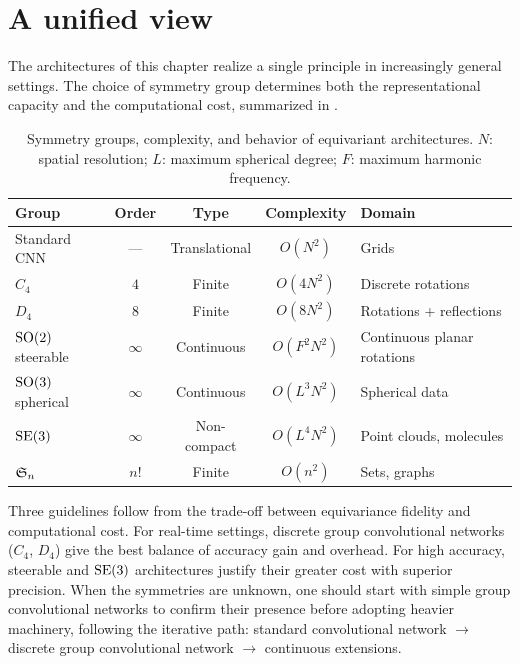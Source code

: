 \section{A unified view}
\label{sec:groups:unified}

The architectures of this chapter realize a single principle in increasingly
general settings. The choice of symmetry group determines both the
representational capacity and the computational cost, summarized in
.

\begin{table}[h]
\centering
\small
\caption{Symmetry groups, complexity, and behavior of equivariant
architectures. $N$: spatial resolution; $L$: maximum spherical degree; $F$:
maximum harmonic frequency.}
\label{tab:groups:comparison}
\begin{tabular}{@{}lcccl@{}}
\toprule
\textbf{Group} & \textbf{Order} & \textbf{Type} & \textbf{Complexity} & \textbf{Domain} \\
\midrule
Standard CNN & --- & Translational & $O(N^2)$ & Grids \\
$C_4$ & $4$ & Finite & $O(4 N^2)$ & Discrete rotations \\
$D_4$ & $8$ & Finite & $O(8 N^2)$ & Rotations + reflections \\
$\operatorname{SO}(2)$ steerable & $\infty$ & Continuous & $O(F^2 N^2)$ & Continuous planar rotations \\
$\operatorname{SO}(3)$ spherical & $\infty$ & Continuous & $O(L^3 N^2)$ & Spherical data \\
$\operatorname{SE}(3)$ & $\infty$ & Non-compact & $O(L^4 N^2)$ & Point clouds, molecules \\
$\mathfrak{S}_n$ & $n!$ & Finite & $O(n^2)$ & Sets, graphs \\
\bottomrule
\end{tabular}
\end{table}

Three guidelines follow from the trade-off between equivariance fidelity and
computational cost. For real-time settings, discrete group convolutional
networks ($C_4$, $D_4$) give the best balance of accuracy gain and overhead. For
high accuracy, steerable and $\operatorname{SE}(3)$ architectures justify their greater cost
with superior precision. When the symmetries are unknown, one should start with
simple group convolutional networks to confirm their presence before adopting
heavier machinery, following the iterative path: standard convolutional network
$\to$ discrete group convolutional network $\to$ continuous extensions.

